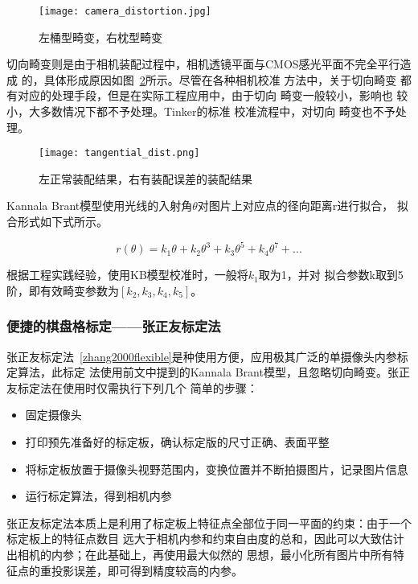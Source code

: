 \begin{figure}[h] %
  \centering
  \texttt{[image: camera\_distortion.jpg]}
  \caption{左桶型畸变，右枕型畸变}
  \label{fig:radial_distort}
\end{figure}

切向畸变则是由于相机装配过程中，相机透镜平面与CMOS感光平面不完全平行造成
的，具体形成原因如图~\ref{fig:tangential_distort}所示。尽管在各种相机校准
方法中，关于切向畸变 都有对应的处理手段，但是在实际工程应用中，由于切向
畸变一般较小，影响也 较小，大多数情况下都不予处理。Tinker的标准
校准流程中，对切向 畸变也不予处理。

\begin{figure}[h] %
  \centering
  \texttt{[image: tangential\_dist.png]}
  \caption{左正常装配结果，右有装配误差的装配结果}
  \label{fig:tangential_distort}
\end{figure}

Kannala Brant模型使用光线的入射角$\theta$对图片上对应点的径向距离r进行拟合，
拟合形式如下式所示。

\begin{equation}
  r(\theta) = k_1\theta + k_2\theta^{3} + k_3\theta^{5} + k_4\theta^{7} + ...
\end{equation}

根据工程实践经验，使用KB模型校准时，一般将$k_1$取为1，并对
拟合参数{k}取到5阶，即有效畸变参数为$[k_2, k_3, k_4, k_5]$。

\subsubsection{便捷的棋盘格标定——张正友标定法}

张正友标定法~\ref{zhang2000flexible}是种使用方便，应用极其广泛的单摄像头内参标定算法，此标定
法使用前文中提到的Kannala Brant模型，且忽略切向畸变。张正友标定法在使用时仅需执行下列几个
简单的步骤：

\begin{itemize}
  \item 固定摄像头
  \item 打印预先准备好的标定板，确认标定版的尺寸正确、表面平整
  \item 将标定板放置于摄像头视野范围内，变换位置并不断拍摄图片，记录图片信息
  \item 运行标定算法，得到相机内参
\end{itemize}

张正友标定法本质上是利用了标定板上特征点全部位于同一平面的约束：由于一个标定板上的特征点数目
远大于相机内参和约束自由度的总和，因此可以大致估计出相机的内参；在此基础上，再使用最大似然的
思想，最小化所有图片中所有特征点的重投影误差，即可得到精度较高的内参。

